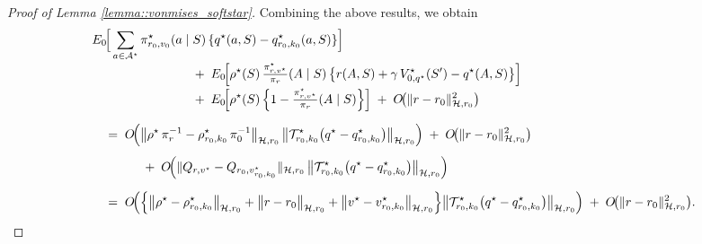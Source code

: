 \documentclass[11pt]{article}
\theoremstyle{plain}
\begin{document}
\begin{proof}[Proof of Lemma \ref{lemma::vonmises_softstar}]
Combining the above results, we obtain
\begin{align*}
& E_0\!\Big[
    \sum_{a \in \mathcal{A}^\star} 
        \pi_{r_0,v_0}^\star(a \mid S)\,
        \{ q^\star(a,S) - q_{r_0,k_0}^\star(a,S) \}
\Big]
\\[-2pt]
&\hspace{2.8cm}
+\;
E_0\!\Big[
    \rho^\star(S)\,
    \tfrac{\pi_{r,v^\star}^\star}{\pi_r}(A \mid S)\,
    \bigl\{
        r(A,S)
        + \gamma\,V_{0,q^\star}^\star(S')
        - q^\star(A,S)
    \bigr\}
\Big]
\\[-2pt]
&\hspace{2.8cm}
+\;
E_0\!\Big[
    \rho^\star(S)\,
    \Bigl\{
        1 - \tfrac{\pi_{r,v^\star}^\star}{\pi_r}(A \mid S)
    \Bigr\}
\Big]
\;+\;
O\!\bigl(\|r - r_0\|_{\mathcal{H},r_0}^2\bigr)
\\[6pt]
&\quad=\;
O\!\Big(
    \bigl\|
        \rho^\star\,\pi_r^{-1}
        - \rho_{r_0,k_0}^\star\,\pi_0^{-1}
    \bigr\|_{\mathcal{H},r_0}\,
    \bigl\|
        \mathcal{T}_{r_0,k_0}^\star
        \bigl(q^\star - q_{r_0,k_0}^\star\bigr)
    \bigr\|_{\mathcal{H},r_0}
\Big)
\;+\;
O\!\bigl(\|r - r_0\|_{\mathcal{H},r_0}^2\bigr)
\\[4pt]
&\qquad\qquad
+\;
O\!\Big(
    \|Q_{r,v^\star} - Q_{r_0,v_{r_0,k_0}^\star}\|_{\mathcal{H},r_0}\,
    \bigl\|
        \mathcal{T}_{r_0,k_0}^\star
        \bigl(q^\star - q_{r_0,k_0}^\star\bigr)
    \bigr\|_{\mathcal{H},r_0}
\Big)
\\[6pt]
&\quad=\;
O\!\Big(
    \Bigl\{
        \bigl\|\rho^\star - \rho_{r_0,k_0}^\star\bigr\|_{\mathcal{H},r_0}
        +
        \bigl\|r - r_0\bigr\|_{\mathcal{H},r_0}
        +
        \bigl\|v^\star - v_{r_0,k_0}^\star\bigr\|_{\mathcal{H},r_0}
    \Bigr\}
    \bigl\|
        \mathcal{T}_{r_0,k_0}^\star
        \bigl(q^\star - q_{r_0,k_0}^\star\bigr)
    \bigr\|_{\mathcal{H},r_0}
\Big)
\;+\;
O\!\bigl(\|r - r_0\|_{\mathcal{H},r_0}^2\bigr).
\end{align*}









\end{proof}
\end{document}
